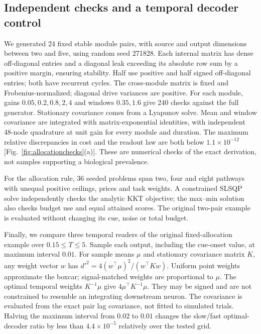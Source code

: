 \subsection{Independent checks and a temporal decoder control}

We generated 24 fixed stable module pairs, with source and output
dimensions between two and five, using random seed 271828.
Each internal matrix has dense off-diagonal entries and a diagonal
leak exceeding its absolute row sum by a positive margin, ensuring
stability. Half use positive and half signed off-diagonal entries;
both have recurrent cycles. The cross-module matrix is fixed and
Frobenius-normalized; diagonal drive variances are positive. For
each module, gains \(0.05,0.2,0.8,2,4\) and windows \(0.35,1.6\)
give 240 checks against the full generator. Stationary covariance
comes from a Lyapunov solve. Mean and window covariance are
integrated with matrix-exponential identities, with independent
48-node quadrature at unit gain for every module and duration.
The maximum relative discrepancies in cost and the readout law
are both below \(1.1\times10^{-12}\)
[Fig.~\ref{fig:allocationchecks}(a)]. These are numerical checks
of the exact derivation, not samples supporting a biological prevalence.

For the allocation rule, 36 seeded problems span two, four and
eight pathways with unequal positive ceilings, prices and task
weights. A constrained SLSQP solve independently checks the
analytic KKT objective; the max--min solution also checks budget
use and equal attained scores. The original two-pair example
is evaluated without changing its cue, noise or total budget.

Finally, we compare three temporal readers of the original
fixed-allocation example over \(0.15\le T\le5\). Sample each
output, including the cue-onset value, at maximum interval
\(0.01\). For sample means \(\mu\) and stationary covariance
matrix \(K\), any weight vector \(w\) has
\(d'^2=4(w^\top\mu)^2/(w^\top K w)\).
Uniform point weights approximate the boxcar; signal-matched
weights are proportional to \(\mu\). The optimal temporal
weights \(K^{-1}\mu\) give \(4\mu^\top K^{-1}\mu\).
They may be signed and are not constrained to resemble an
integrating downstream neuron. The covariance is evaluated from
the exact pair lag covariance, not fitted to simulated trials.
Halving the maximum interval from \(0.02\) to \(0.01\) changes
the slow/fast optimal-decoder ratio by less than
\(4.4\times10^{-5}\) relatively over the tested grid.

